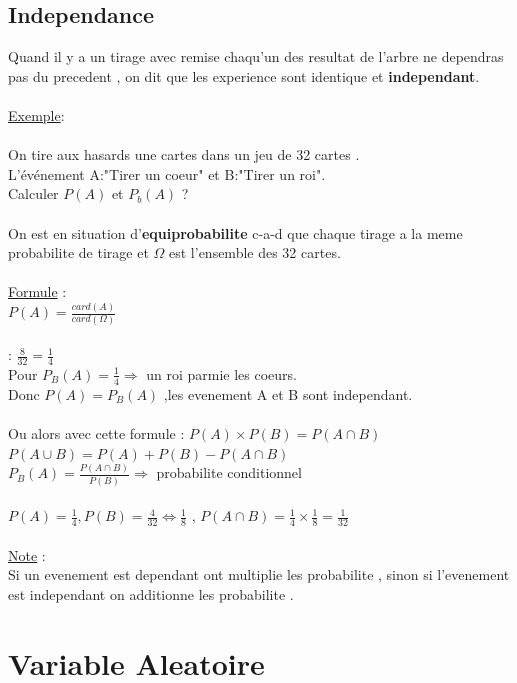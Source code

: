 \documentclass[a4paper,8pt,openany]{book}
\begin{document}
\section{Independance}
Quand il y a un tirage avec remise chaqu'un des resultat de l'arbre ne dependras pas du precedent , on dit que les experience sont identique et \textbf{independant}.\\
\\
\underline{Exemple}:\\
\\
On tire aux hasards une cartes dans un jeu de 32 cartes .\\
L'\'ev\'enement A:"Tirer un coeur" et B:"Tirer un roi".\\
Calculer $P(A)$ et $P_{b}(A)$ ? \\
\\
On est en situation d'\textbf{equiprobabilite} c-a-d que chaque tirage a la meme probabilite de tirage et 
$\Omega$ est l'ensemble des 32 cartes.\\
\\
\underline{Formule} : \\
$P(A)=\frac{card(A)}{card(\Omega)}$\\
\\
:  $\frac{8}{32}=\frac{1}{4}$\\
Pour $P_B(A)=\frac{1}{4} \Rightarrow$ un roi parmie les coeurs.\\
Donc $P(A)=P_B(A)$ ,les evenement A et B sont independant.\\
\\
Ou alors avec cette formule : $P(A)\times P(B)=P(A\cap B)$\\
$P(A\cup B)=P(A)+P(B)-P(A\cap B)$\\
$P_B(A)=\frac{P(A\cap B)}{P(B)} \Rightarrow$ probabilite conditionnel\\
\\
$P(A)=\frac{1}{4} , P(B)=\frac{4}{32} \Leftrightarrow \frac{1}{8}$ , 
$P(A\cap B)=\frac{1}{4}\times \frac{1}{8}=\frac{1}{32}$\\
\\
\underline{Note} : \\
Si un evenement est dependant ont multiplie les probabilite , sinon si l'evenement est independant on additionne les probabilite .\\

\chapter{Variable Aleatoire}
\end{document}

